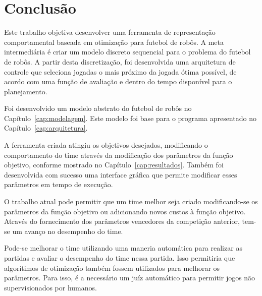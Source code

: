 \chapter{Conclusão}\label{cap:conclusao}


Este trabalho objetiva desenvolver uma ferramenta de representação
comportamental baseada em otimização para futebol de robôs.
A meta intermediária é criar um modelo discreto sequencial
para o problema do futebol de robôs. A partir desta
discretização, foi desenvolvida uma arquitetura de controle
que seleciona jogadas o mais próximo da jogada ótima possível,
de acordo com uma função de avaliação e dentro do tempo disponível
para o planejamento.

Foi desenvolvido um modelo abstrato do futebol de robôs no
Capítulo~\ref{cap:modelagem}. Este modelo foi base para o
programa apresentado no Capítulo~\ref{cap:arquitetura}.

A ferramenta criada atingiu os objetivos desejados, modificando o
comportamento do time através da modificação dos parâmetros da função
objetivo, conforme mostrado no Capítulo~\ref{cap:resultados}. Também foi
desenvolvida com sucesso uma interface gráfica que permite modificar
esses parâmetros em tempo de execução.

O trabalho atual pode permitir que um time melhor seja criado modificando-se os
parâmetros da função objetivo ou adicionando novos custos à função objetivo.  
Através do fornecimento dos parâmetros vencedores da competição anterior, tem-se
um avanço no desempenho do time.

Pode-se melhorar o time utilizando uma maneria automática para
realizar as partidas e avaliar o desempenho do time nessa partida. Isso
permitiria que algorítimos de otimização também fossem utilizados para melhorar
os parâmetros. Para isso, é a necessário um juíz automático para permitir jogos
não supervisionados por humanos. %

